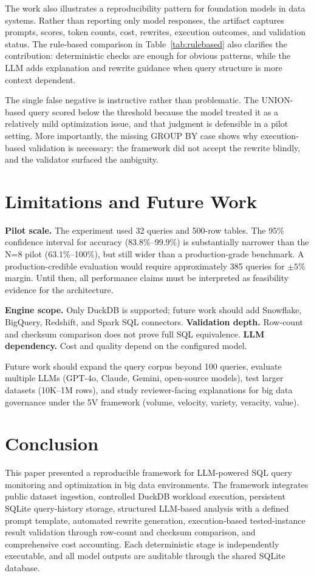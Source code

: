 \documentclass[conference]{IEEEtran}
\begin{document}
The work also illustrates a reproducibility pattern for foundation models in data systems. Rather than reporting only model responses, the artifact captures prompts, scores, token counts, cost, rewrites, execution outcomes, and validation status. The rule-based comparison in Table~\ref{tab:rulebased} also clarifies the contribution: deterministic checks are enough for obvious patterns, while the LLM adds explanation and rewrite guidance when query structure is more context dependent.

The single false negative is instructive rather than problematic. The UNION-based query scored below the threshold because the model treated it as a relatively mild optimization issue, and that judgment is defensible in a pilot setting. More importantly, the missing GROUP BY case shows why execution-based validation is necessary: the framework did not accept the rewrite blindly, and the validator surfaced the ambiguity.

\section{Limitations and Future Work}
\label{sec:limitations}
\textbf{Pilot scale.} The experiment used 32 queries and 500-row tables. The 95\% confidence interval for accuracy (83.8\%--99.9\%) is substantially narrower than the N=8 pilot (63.1\%--100\%), but still wider than a production-grade benchmark. A production-credible evaluation would require approximately 385 queries for $\pm5\%$ margin. Until then, all performance claims must be interpreted as feasibility evidence for the architecture.

\textbf{Engine scope.} Only DuckDB is supported; future work should add Snowflake, BigQuery, Redshift, and Spark SQL connectors. \textbf{Validation depth.} Row-count and checksum comparison does not prove full SQL equivalence. \textbf{LLM dependency.} Cost and quality depend on the configured model.

Future work should expand the query corpus beyond 100 queries, evaluate multiple LLMs (GPT-4o, Claude, Gemini, open-source models), test larger datasets (10K--1M rows), and study reviewer-facing explanations for big data governance under the 5V framework (volume, velocity, variety, veracity, value).

\section{Conclusion}
This paper presented a reproducible framework for LLM-powered SQL query monitoring and optimization in big data environments. The framework integrates public dataset ingestion, controlled DuckDB workload execution, persistent SQLite query-history storage, structured LLM-based analysis with a defined prompt template, automated rewrite generation, execution-based tested-instance result validation through row-count and checksum comparison, and comprehensive cost accounting. Each deterministic stage is independently executable, and all model outputs are auditable through the shared SQLite database.
\end{document}
